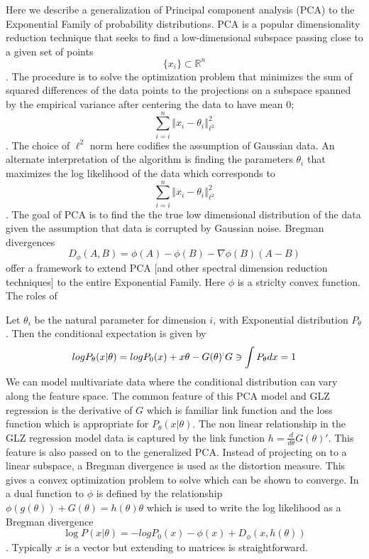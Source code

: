 \documentclass[a4paper]{article}
\newcommand{\norm}[1]{\left\Vert#1\right\Vert}
\theoremstyle{plain}
\theoremstyle{definition}
\theoremstyle{remark}
\numberwithin{equation}{section}
\begin{document}
Here we describe a generalization  of Principal component analysis (PCA) to the Exponential Family of probability distributions.  PCA is a popular dimensionality reduction technique that seeks to find a low-dimensional subspace passing close to a given set of points \begin{equation*}\{x_i\} \subset \mathbb{R}^n\end{equation*}.  The procedure is to solve the optimization problem that minimizes the sum of squared differences of the data points to the projections on a subspace spanned by the empirical variance after centering the data to have mean $0$;
\begin{equation*}
\sum\limits_{i=i}^{n} \norm{x_i - \theta_i}^2_{\ell^2}
\end{equation*}.  The choice of $\ell^2$ norm here codifies the assumption of Gaussian data.  An alternate interpretation of the algorithm is finding the  parameters ${\theta_i}$ that maximizes the log likelihood of the data which corresponds to \begin{equation*}
\sum\limits_{i=i}^{n} \norm{x_i - \theta_i}^2_{\ell^2}
\end{equation*}.  The goal of PCA is to find the the true low dimensional distribution   of the data given the assumption that data is corrupted by Gaussian noise.
Bregman divergences
  \begin{equation*}
  D_\phi(A,B)=\phi(A)-\phi(B) - \nabla \phi(B) (A-B)
\end{equation*}
offer a framework to extend PCA [and other spectral dimension reduction techniques] to the entire Exponential Family.  Here $\phi$ is a striclty convex function.  The roles of

Let  $\theta_i$ be the natural parameter for dimension $i$, with Exponential distribution $P_\theta$.  Then the conditional expectation is given by
\begin{equation*}
log P_\theta (x| \theta) = log P_0(x) + x \theta - G(\theta)  \sp : G \ni \int{ P_\theta dx} =1
\end{equation*}
We can model multivariate data where the conditional distribution can vary along the feature space.  The common feature of this PCA model and GLZ regression is the derivative of $G$ which is familiar link function and the loss function which is appropriate for $P_\theta (x | \theta)$.  The non linear relationship in the GLZ regression model data is captured by the link function $h = \frac{d}{d \theta}G(\theta)'$.  This feature is also passed on to the generalized PCA.  Instead of projecting on to a linear subspace, a Bregman divergence is used as the distortion measure.  This gives a convex optimization problem to solve which can be shown to converge.  In \cite{BDAzoury99relativeloss} a dual function  to  $\phi$ is defined by the relationship $\phi(g(\theta))+G(\theta)=h(\theta) \theta$ which is used to write the log likelihood as a Bregman divergence
\begin{equation*}
    \log P( x | \theta ) = -log P_0(x) - \phi(x) + D_\phi (x,h(\theta))
\end{equation*}.  Typically $x$ is a vector but extending to matrices is straightforward.
\end{document}
